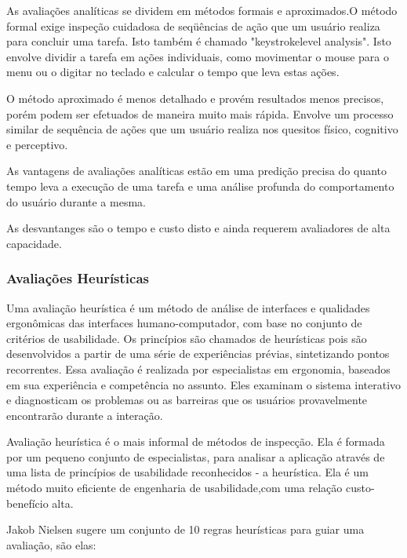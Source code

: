 As avaliações analíticas se dividem em métodos formais e aproximados.O método formal exige inspeção cuidadosa de seqüências de ação que um usuário realiza para concluir uma tarefa. Isto também é chamado "keystrokelevel analysis". Isto envolve dividir a tarefa em ações individuais, como movimentar o mouse para o menu ou o digitar no teclado e calcular o tempo que leva estas ações. 

O método aproximado é menos detalhado e provém resultados menos precisos, porém podem ser efetuados de maneira muito mais rápida. Envolve um processo similar de sequência de ações que um usuário realiza nos quesitos físico, cognitivo e perceptivo. 

As vantagens de avaliações analíticas estão em uma predição precisa do quanto tempo leva a execução de uma tarefa e uma análise profunda do comportamento do usuário durante a mesma.

As desvantanges são o tempo e custo disto e ainda requerem avaliadores de alta capacidade.
\cite{andreas_holzinger}

\subsubsection{Avaliações Heurísticas}

Uma avaliação heurística é um método de análise de interfaces e qualidades ergonômicas das interfaces humano-computador, com base no conjunto de critérios de usabilidade.  Os princípios são chamados de heurísticas pois são desenvolvidos a partir de uma série de experiências prévias, sintetizando pontos recorrentes. Essa avaliação é realizada por especialistas em ergonomia, baseados em sua experiência e competência no assunto. Eles examinam o sistema interativo e diagnosticam os problemas ou as barreiras que os usuários provavelmente encontrarão durante a interação.
\cite{cybil_apostila}

Avaliação heurística é o mais informal de métodos de inspecção. Ela é formada por um pequeno conjunto de especialistas, para analisar a aplicação através de uma lista de princípios de usabilidade reconhecidos - a heurística. Ela é um método muito eficiente de engenharia de usabilidade,com uma relação custo-benefício alta.

Jakob Nielsen sugere um conjunto de 10 regras heurísticas para guiar uma avaliação, são elas:

